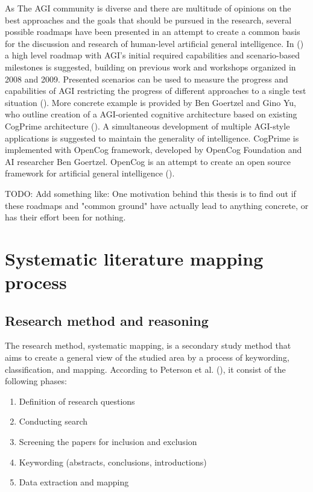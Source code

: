 \documentclass[utf8,english]{gradu3}
\begin{document}
As The AGI community is diverse and there are multitude of opinions on the best approaches and the goals that should be pursued in the research, several possible roadmaps have been presented in an attempt to create a common basis for the discussion and research of human-level artificial general intelligence. In (\cite{adams2012}) a high level roadmap with AGI's initial required capabilities and scenario-based milestones is suggested, building on previous work and workshops organized in 2008 and 2009. Presented scenarios can be used to measure the progress and capabilities of AGI restricting the progress of different approaches to a single test situation (\cite{adams2012}).
More concrete example is provided by Ben Goertzel and Gino Yu, who outline creation of a AGI-oriented cognitive architecture based on existing CogPrime architecture (\cite{goertzel2014map}). A simultaneous development of multiple AGI-style applications is suggested to maintain the generality of intelligence. CogPrime is implemented with OpenCog framework, developed by OpenCog Foundation and AI researcher Ben Goertzel. OpenCog is an attempt to create an open source framework for artificial general intelligence (\cite{opencogwiki,goertzel2012cog}).

TODO: Add something like: One motivation behind this thesis is to find out if these roadmaps and "common ground" have actually lead to anything concrete, or has their effort been for nothing.


\chapter{Systematic literature mapping process}

\section{Research method and reasoning}

\label{method}
The research method, systematic mapping, is a secondary study method that aims to create a general view of the studied area by a process of keywording, classification, and mapping. According to Peterson et al. (\cite*{petersen2008}), it consist of the following phases:
\begin{enumerate}
    \item Definition of research questions
    \item Conducting search
    \item Screening the papers for inclusion and exclusion
    \item Keywording (abstracts, conclusions, introductions)
    \item Data extraction and mapping
\end{enumerate}
\end{document}
